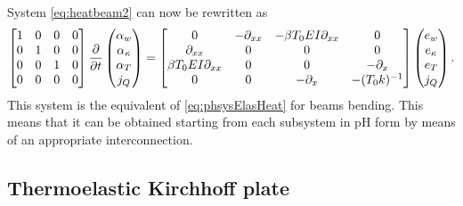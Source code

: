 System \eqref{eq:heatbeam2} can now be rewritten as
\begin{equation}\label{eq:phsysTEbeam}
\begin{bmatrix}
1 & 0 & 0 & 0\\
0 & 1 & 0 & 0\\
0 & 0 & 1 & 0\\
0 & 0 & 0 & 0\\
\end{bmatrix}
\diffp{}{t}
\begin{pmatrix}
\alpha_w \\
\alpha_\kappa \\
{\alpha}_T \\
{j}_Q \\
\end{pmatrix} = 
\begin{bmatrix}
{0} & -\partial_{xx} & - \beta T_0 E I \partial_{xx} & {0}\\
\partial_{xx} & {0} & {0} & {0} \\
\beta T_0 E I \partial_{xx} & 0 & 0 & -\partial_{x} \\
{0} & {0} & -\partial_{x} & - (T_0 k)^{-1} \\
\end{bmatrix}
\begin{pmatrix}
e_w \\
e_\kappa \\
e_T \\
{j}_Q \\
\end{pmatrix}. 
\end{equation}
This system is the equivalent of \eqref{eq:phsysElasHeat} for beams bending. This means that it can be obtained starting from each subsystem in pH form by means of an appropriate interconnection.


\subsection{Thermoelastic Kirchhoff plate}
